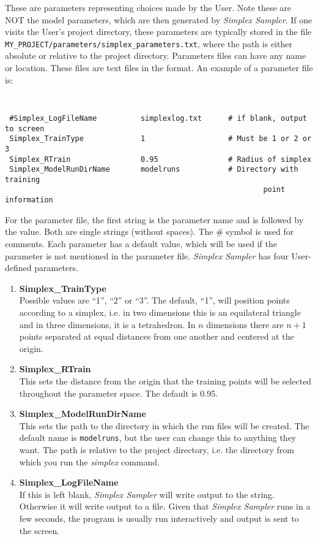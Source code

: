 \documentclass[UserManual.tex]{subfiles}
\begin{document}
These are parameters representing choices made by the User. Note these are NOT the model parameters, which are then generated by {\it Simplex Sampler}. If one visits the User's project directory, these parameters are typically stored in the file   {\tt MY\_PROJECT/parameters/simplex\_parameters.txt}, where the path is either absolute or relative to the project directory.
Parameters files can have any name or location. These files are text files in the format. An example of a parameter file is:
{\tt
\begin{verbatim}
 #Simplex_LogFileName          simplexlog.txt      # if blank, output to screen
 Simplex_TrainType             1                   # Must be 1 or 2 or 3
 Simplex_RTrain                0.95                # Radius of simplex
 Simplex_ModelRunDirName       modelruns           # Directory with training
                                                           point information
\end{verbatim}
}
For the parameter file, the first string is the parameter name and is followed by the value. Both are single strings (without spaces). The \# symbol is used for comments. Each parameter has a default value, which will be used if the parameter is not mentioned in the parameter file.  {\it Simplex Sampler} has four User-defined parameters.
\begin{enumerate}\itemsep 0pt
    \item {\bf Simplex\_TrainType}\\
Possible values are ``1'', ``2'' or ``3''. The default, ``1'', will position points according to a simplex, i.e. in two dimensions this is an equilateral triangle and in three dimensions, it is a tetrahedron. In $n$ dimensions there are $n+1$ points separated at equal distances from one another and centered at the origin. 
\item {\bf Simplex\_RTrain}\\
This sets the distance from the origin that the training points will be selected throughout the parameter space. The default is 0.95.
\item {\bf Simplex\_ModelRunDirName}\\
This sets the path to the directory in which the run files will be created. The default name is {\tt{modelruns}}, but the user can change this to anything they want. The path is relative to the project directory, i.e. the directory from which you run the {\it simplex} command.
\item {\bf Simplex\_LogFileName}\\
If this is left blank, {\it Simplex Sampler} will write output to the string. Otherwise it will write output to a file. Given that {\it Simplex Sampler} runs in a few seconds, the program is usually run interactively and output is sent to the screen.
\end{enumerate}
\end{document}
